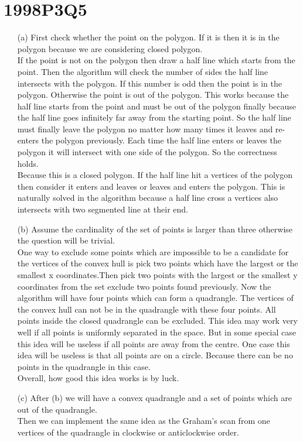 \documentclass[10pt,twoside,a4paper]{article}
\begin{document}
\section{1998P3Q5}
\begin{itemize}
\item[(a)]
First check whether the point on the polygon. If it is then it is in the polygon because we are considering closed polygon.
\\If the point is not on the polygon then draw a half line which starts from the point. Then the algorithm will check the number of sides the half line intersects with the polygon. If this number is odd then the point is in the polygon. Otherwise the point is out of the polygon. This works because the half line starts from the point and must be out of the polygon finally because the half line goes infinitely far away from the starting point. So the half line must finally leave the polygon no matter how many times it leaves and re-enters the polygon previously. Each time the half line enters or leaves the polygon it will intersect with one side of the polygon. So the correctness holds.
\\Because this is a closed polygon. If the half line hit a vertices of the polygon then consider it enters and leaves or leaves and enters the polygon. This is naturally solved in the algorithm because a half line cross a vertices also intersects with two segmented line at their end.
\item[(b)]
Assume the cardinality of the set of points is larger than three otherwise the question will be trivial.
\\One way to exclude some points which are impossible to be a candidate for the vertices of the convex hull is pick two points which have the largest or the smallest x coordinates.Then pick two points with the largest or the smallest y coordinates from the set exclude two points found previously. Now the algorithm will have four points which can form a quadrangle. The vertices of the convex hull can not be in the quadrangle with these four points. All points inside the closed quadrangle can be excluded. This idea may work very well if all points is uniformly separated in the space. But in some special case this idea will be useless if all points are away from the centre. One case this idea will be useless is that all points are on a circle. Because there can be no points in the quadrangle in this case. 
\\Overall, how good this idea works is by luck.
\item[(c)]
After (b) we will have a convex quadrangle and a set of points which are out of the quadrangle.
\\Then we can implement the same idea as the Graham's scan from one vertices of the quadrangle in clockwise or anticlockwise order.
\end{itemize}
\end{document}
